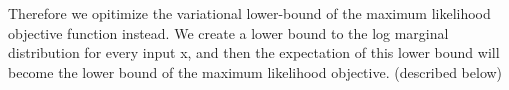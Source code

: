 \documentclass[11pt]{article}
\begin{document}
Therefore we opitimize the variational lower-bound of the maximum likelihood objective function instead. We create a lower bound to the log marginal distribution for every input x, and then the expectation of this lower bound will become the lower bound of the maximum likelihood objective. (described below)

\begin{figure}[H]
    \centering

\end{figure}
\end{document}
